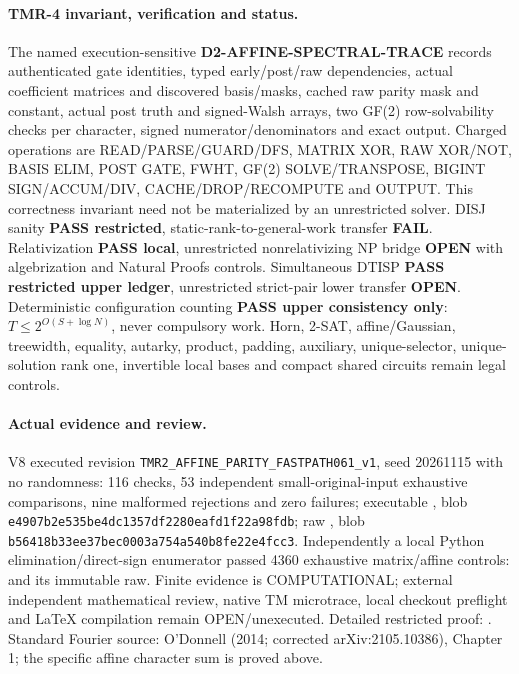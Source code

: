 \documentclass[11pt]{article}
\begin{document}
\paragraph{TMR-4 invariant, verification and status.}
The named execution-sensitive \textbf{D2-AFFINE-SPECTRAL-TRACE} records authenticated gate identities, typed early/post/raw dependencies, actual coefficient matrices and discovered basis/masks, cached raw parity mask and constant, actual post truth and signed-Walsh arrays, two GF(2) row-solvability checks per character, signed numerator/denominators and exact output. Charged operations are READ/PARSE/GUARD/DFS, MATRIX XOR, RAW XOR/NOT, BASIS ELIM, POST GATE, FWHT, GF(2) SOLVE/TRANSPOSE, BIGINT SIGN/ACCUM/DIV, CACHE/DROP/RECOMPUTE and OUTPUT. This correctness invariant need not be materialized by an unrestricted solver. DISJ sanity \textbf{PASS restricted}, static-rank-to-general-work transfer \textbf{FAIL}. Relativization \textbf{PASS local}, unrestricted nonrelativizing NP bridge \textbf{OPEN} with algebrization and Natural Proofs controls. Simultaneous DTISP \textbf{PASS restricted upper ledger}, unrestricted strict-pair lower transfer \textbf{OPEN}. Deterministic configuration counting \textbf{PASS upper consistency only}: $T\le2^{O(S+\log N)}$, never compulsory work. Horn, 2-SAT, affine/Gaussian, treewidth, equality, autarky, product, padding, auxiliary, unique-selector, unique-solution rank one, invertible local bases and compact shared circuits remain legal controls.

\paragraph{Actual evidence and review.}
V8 executed revision \texttt{TMR2\_AFFINE\_PARITY\_FASTPATH061\_v1}, seed 20261115 with no randomness: 116 checks, 53 independent small-original-input exhaustive comparisons, nine malformed rejections and zero failures; executable , blob \texttt{e4907b2e535be4dc1357df2280eafd1f22a98fdb}; raw , blob \texttt{b56418b33ee37bec0003a754a540b8fe22e4fcc3}. Independently a local Python elimination/direct-sign enumerator passed 4360 exhaustive matrix/affine controls:  and its immutable raw. Finite evidence is COMPUTATIONAL; external independent mathematical review, native TM microtrace, local checkout preflight and LaTeX compilation remain OPEN/unexecuted. Detailed restricted proof: . Standard Fourier source: O'Donnell (2014; corrected arXiv:2105.10386), Chapter 1; the specific affine character sum is proved above.
\end{document}
